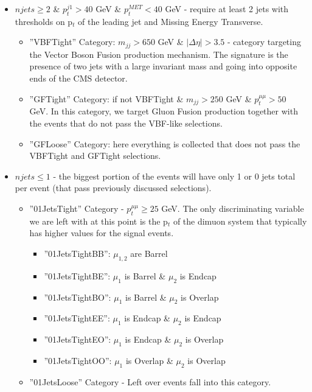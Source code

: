 \begin{itemize}
  \item $njets \ge 2$ \& $p_{t}^{j1} > 40$ GeV \& $p_{t}^{MET} < 40$ GeV - require at least 2 jets with thresholds on p$_t$ of the leading jet and Missing Energy Transverse.
    \begin{itemize}
      \item ''VBFTight'' Category: $m_{jj} > 650$ GeV \& $|\Delta \eta| > 3.5$ - category targeting the Vector Boson Fusion production mechanism. The signature is the presence of two jets with a large invariant mass and going into opposite ends of the CMS detector.
      \item ''GFTight'' Category: if not VBFTight \& $m_{jj} > 250$ GeV \& $p_{t}^{\mu\mu} > 50$ GeV. In this category, we target Gluon Fusion production together with the events that do not pass the VBF-like selections.
      \item ''GFLoose'' Category: here everything is collected that does not pass the VBFTight and GFTight selections.
    \end{itemize}
  \item $njets \le 1$ - the biggest portion of the events will have only 1 or 0 jets total per event (that pass previously discussed selections).
    \begin{itemize}
      \item ''01JetsTight'' Category - $p_t^{\mu\mu} \ge 25$ GeV. The only discriminating variable we are left with at this point is the p$_t$ of the dimuon system that typically has higher values for the signal events.
        \begin{itemize}
          \item ''01JetsTightBB'': $\mu_{1,2}$ are Barrel
          \item ''01JetsTightBE'': $\mu_{1}$ is Barrel \& $\mu_2$ is Endcap
          \item ''01JetsTightBO'': $\mu_{1}$ is Barrel \& $\mu_2$ is Overlap
          \item ''01JetsTightEE'': $\mu_{1}$ is Endcap \& $\mu_2$ is Endcap
          \item ''01JetsTightEO'': $\mu_{1}$ is Endcap \& $\mu_2$ is Overlap
          \item ''01JetsTightOO'': $\mu_{1}$ is Overlap \& $\mu_2$ is Overlap
        \end{itemize}
      \item ''01JetsLoose'' Category - Left over events fall into this category.
        \begin{itemize}

\end{itemize}
\end{itemize}
\end{itemize}
